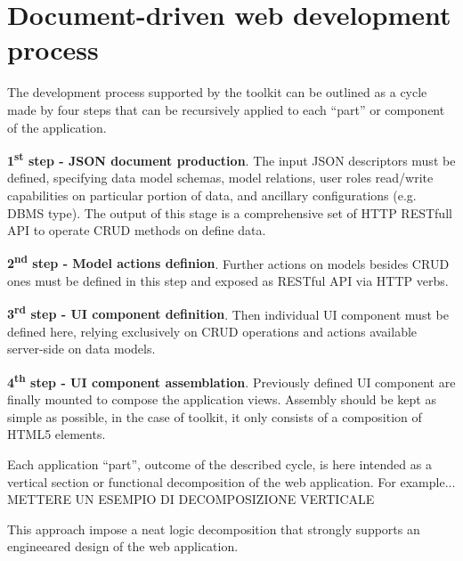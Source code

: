\section{Document-driven web development process}\label{sec:dev-proc}

The development process supported by the toolkit can be outlined as a cycle made by four steps that can be recursively applied to each ``part'' or component of the application. 

{\bf 1\textsuperscript{st} step - JSON document production}. The input JSON descriptors must be defined, specifying data model schemas, model relations, user roles read/write capabilities on particular portion of data, and ancillary configurations (e.g. DBMS type). The output of this stage is a comprehensive set of HTTP RESTfull API to operate CRUD methods on define data.

{\bf 2\textsuperscript{nd} step - Model actions definion}. Further actions on models besides CRUD ones must be defined in this step and exposed as RESTful API via HTTP verbs.

{\bf 3\textsuperscript{rd} step - UI component definition}. Then individual UI component must be defined here, relying exclusively on CRUD operations and actions available server-side on data models.

{\bf 4\textsuperscript{th} step - UI component assemblation}. Previously defined UI component are finally mounted to compose the application views. Assembly should be kept as simple as possible, in the case of  toolkit, it only consists of a composition of HTML5 elements.




Each application ``part'', outcome of the described cycle, is here intended as a vertical section or functional decomposition of the web application. 
For example... METTERE UN ESEMPIO DI DECOMPOSIZIONE VERTICALE

This approach impose a neat logic decomposition that strongly supports an engineeared design of the web application.
